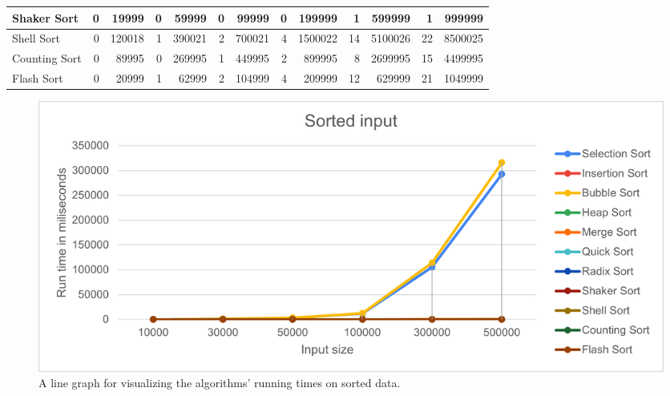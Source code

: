 \documentclass{article}
\begin{document}
\begin{table}[H]
\begin{adjustbox}{width=\columnwidth,center}
\begin{tabular}{|l|rrrrrrrrrrrr|}
Shaker Sort                        & \multicolumn{1}{r|}{0}            & \multicolumn{1}{r|}{19999}      & \multicolumn{1}{r|}{0}            & \multicolumn{1}{r|}{59999}      & \multicolumn{1}{r|}{0}            & \multicolumn{1}{r|}{99999}      & \multicolumn{1}{r|}{0}            & \multicolumn{1}{r|}{199999}     & \multicolumn{1}{r|}{1}            & \multicolumn{1}{r|}{599999}      & \multicolumn{1}{r|}{1}            & 999999                          \\ \hline
Shell Sort                         & \multicolumn{1}{r|}{0}            & \multicolumn{1}{r|}{120018}     & \multicolumn{1}{r|}{1}            & \multicolumn{1}{r|}{390021}     & \multicolumn{1}{r|}{2}            & \multicolumn{1}{r|}{700021}     & \multicolumn{1}{r|}{4}            & \multicolumn{1}{r|}{1500022}    & \multicolumn{1}{r|}{14}           & \multicolumn{1}{r|}{5100026}     & \multicolumn{1}{r|}{22}           & 8500025                         \\ \hline
Counting Sort                      & \multicolumn{1}{r|}{0}            & \multicolumn{1}{r|}{89995}      & \multicolumn{1}{r|}{0}            & \multicolumn{1}{r|}{269995}     & \multicolumn{1}{r|}{1}            & \multicolumn{1}{r|}{449995}     & \multicolumn{1}{r|}{2}            & \multicolumn{1}{r|}{899995}     & \multicolumn{1}{r|}{8}            & \multicolumn{1}{r|}{2699995}     & \multicolumn{1}{r|}{15}           & 4499995                         \\ \hline
Flash Sort                         & \multicolumn{1}{r|}{0}            & \multicolumn{1}{r|}{20999}      & \multicolumn{1}{r|}{1}            & \multicolumn{1}{r|}{62999}      & \multicolumn{1}{r|}{2}            & \multicolumn{1}{r|}{104999}     & \multicolumn{1}{r|}{4}            & \multicolumn{1}{r|}{209999}     & \multicolumn{1}{r|}{12}           & \multicolumn{1}{r|}{629999}      & \multicolumn{1}{r|}{21}           & 1049999                         \\ \hline
\end{tabular}
\end{adjustbox}
\end{table}

\begin{figure}[H]
\includegraphics[scale = 0.8]{SortedLines.png}
\caption{ A line graph for visualizing the algorithms’ running times on sorted data.}
\centering
\end{figure}
\end{document}
